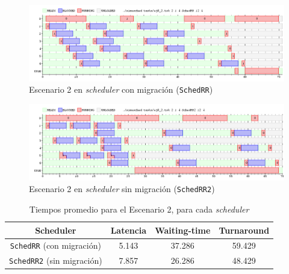 \begin{figure}[H]
    \begin{center}
        \includegraphics[width=1\columnwidth]{imagenes/ej8_2_rr.png}
        \caption{Escenario 2 en \emph{scheduler} con migración (\texttt{SchedRR})}
    \end{center}
\end{figure}

\begin{figure}[H]
    \begin{center}
        \includegraphics[width=1\columnwidth]{imagenes/ej8_2_rr2.png}
        \caption{Escenario 2 en \emph{scheduler} sin migración (\texttt{SchedRR2})}
    \end{center}
\end{figure}

\begin{table}[H]
    \begin{center}
        \begin{tabular}{|c|c|c|c|}
            \hline
            \textbf{Scheduler}                 & \textbf{Latencia} & \textbf{Waiting-time} & \textbf{Turnaround} \\ \hline
            \texttt{SchedRR} (con migración)   & 5.143             & 37.286                & 59.429 \\
            \texttt{SchedRR2} (sin migración)  & 7.857             & 26.286                & 48.429 \\ \hline
        \end{tabular}
        \caption{Tiempos promedio para el Escenario 2, para cada \emph{scheduler}}
    \end{center}
\end{table}


